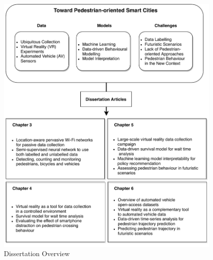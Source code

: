  \begin{figure}
   \centering
   \includegraphics[width=\textwidth]{chapter_1/figures/frame.pdf} %
   \caption{Dissertation Overview}
   \label{fig: framework}
 \end{figure}